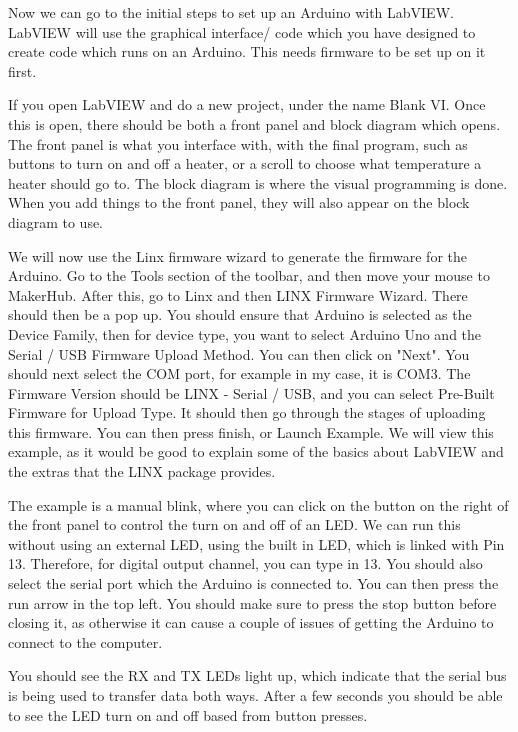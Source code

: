 \documentclass[a4paper,11pt]{report}
\begin{document}
Now we can go to the initial steps to set up an Arduino with LabVIEW. LabVIEW will use the graphical interface/ code which you have designed to create code which runs on an Arduino. This needs firmware to be set up on it first.

If you open LabVIEW and do a new project, under the name Blank VI. Once this is open, there should be both a front panel and block diagram which opens. The front panel is what you interface with, with the final program, such as buttons to turn on and off a heater, or a scroll to choose what temperature a heater should go to. The block diagram is where the visual programming is done. When you add things to the front panel, they will also appear on the block diagram to use.

We will now use the Linx firmware wizard to generate the firmware for the Arduino. Go to the Tools section of the toolbar, and then move your mouse to MakerHub. After this, go to Linx and then LINX Firmware Wizard. There should then be a pop up. You should ensure that Arduino is selected as the Device Family, then for device type, you want to select Arduino Uno and the Serial / USB Firmware Upload Method. You can then click on "Next". You should next select the COM port, for example in my case, it is COM3. The Firmware Version should be LINX - Serial / USB, and you can select Pre-Built Firmware for Upload Type. It should then go through the stages of uploading this firmware. You can then press finish, or Launch Example. We will view this example, as it would be good to explain some of the basics about LabVIEW and the extras that the LINX package provides.

The example is a manual blink, where you can click on the button on the right of the front panel to control the turn on and off of an LED. We can run this without using an external LED, using the built in LED, which is linked with Pin 13. Therefore, for digital output channel, you can type in 13. You should also select the serial port which the Arduino is connected to. You can then press the run arrow in the top left. You should make sure to press the stop button before closing it, as otherwise it can cause a couple of issues of getting the Arduino to connect to the computer.

You should see the RX and TX LEDs light up, which indicate that the serial bus is being used to transfer data both ways. After a few seconds you should be able to see the LED turn on and off based from button presses.



\printnoidxglossary[sort=standard]
\end{document}
